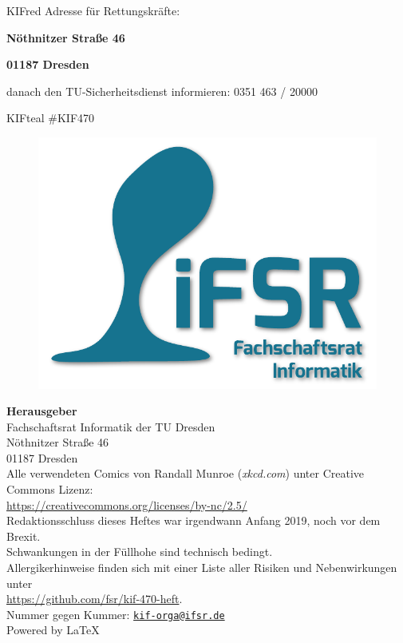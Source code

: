 \begin{awesomeblock}[KIFred]{2pt}{\faFire}{KIFred}
    Adresse für Rettungskräfte:

    \begin{center}
      \textbf{Nöthnitzer Straße 46}

      \textbf{01187 Dresden}
    \end{center}

   danach den TU-Sicherheitsdienst informieren:
  0351 463 / 20000
\end{awesomeblock}
\begin{awesomeblock}[KIFteal]{2pt}{\faTwitter}{KIFteal}
  \#KIF470
\end{awesomeblock}

\vfill

\setlength{\parindent}{0cm}

\begin{figure}
  \vspace*{-20pt}
  \includegraphics[width=.4\textwidth]{img/imprint}
\end{figure}

\footnotesize
\textbf{Herausgeber} \\
Fachschaftsrat Informatik der TU Dresden\\
Nöthnitzer Straße 46\\
01187 Dresden\\[1\baselineskip]

Alle verwendeten Comics von Randall Munroe (\textit{xkcd.com}) unter Creative Commons Lizenz:\\
\url{https://creativecommons.org/licenses/by-nc/2.5/}\\[1\baselineskip]

Redaktionsschluss dieses Heftes war irgendwann Anfang 2019, noch vor dem Brexit.\\%
Schwankungen in der Füllhohe sind technisch bedingt.\\[1\baselineskip]

Allergikerhinweise finden sich mit einer Liste aller Risiken und Nebenwirkungen unter\\
\url{https://github.com/fsr/kif-470-heft}.\\[1\baselineskip]

Nummer gegen Kummer: \href{mailto:kif-orga@ifsr.de}{\texttt{kif-orga@ifsr.de}}\\[1\baselineskip]

Powered by \LaTeX%
